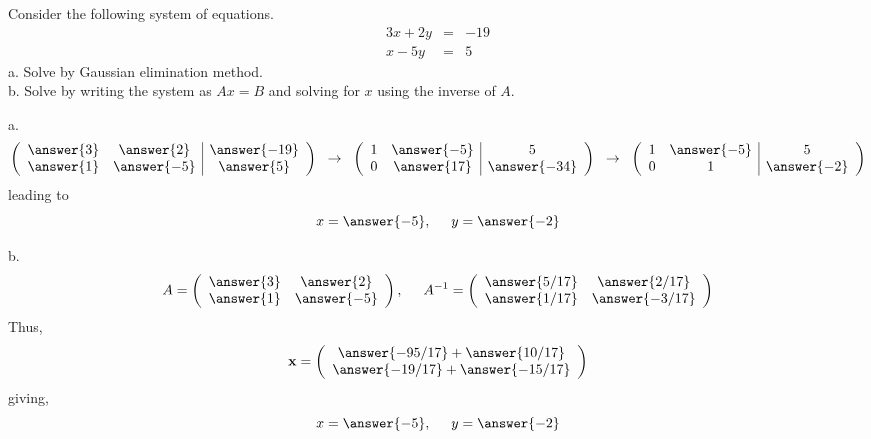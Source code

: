 \documentclass{ximera}
\author{Parisa Fatheddin}
\begin{document}
\begin{exercise}
Consider the following system of equations.
\begin{eqnarray*}
3x+ 2y&=& -19\\
x-5y &=& 5
\end{eqnarray*}
a. Solve by Gaussian elimination method. \\
b. Solve by writing the system as $Ax=B$ and solving for $x$ using the inverse of $A$. 
\begin{prompt}
a.
\[\left(\begin{array}{cc|c}
\answer{3} & \answer{2} & \answer{-19}\\
\answer{1} & \answer{-5} & \answer{5}
\end{array}\right) \hspace{.2cm} \rightarrow \hspace{.2cm}
\left(\begin{array}{cc|c}
1 & \answer{-5} & 5\\
0 & \answer{17} & \answer{-34}
\end{array}\right)\hspace{.2cm} \rightarrow \hspace{.2cm}
\left(\begin{array}{cc|c}
1 & \answer{-5} & 5\\
0 & 1 & \answer{-2}
\end{array}\right)
\]
leading to
\begin{equation*}
x= \answer{-5}, \hspace{.5cm} y = \answer{-2}
\end{equation*}

b.
\[A= \left(\begin{array}{cc}
\answer{3} & \answer{2}\\
\answer{1} & \answer{-5}
\end{array} \right), \hspace{.5cm} A^{-1}= \left(\begin{array}{cc}
\answer{5/17} & \answer{2/17}\\
\answer{1/17} & \answer{-3/17}
\end{array} \right)
\]
Thus,
\[
\textbf{x} = \left(\begin{array}{c}
\answer{-95/17} + \answer{10/17}\\
\answer{-19/17} + \answer{-15/17}
\end{array}\right)
\]
giving,
\begin{equation*}
x= \answer{-5}, \hspace{.5cm} y = \answer{-2}
\end{equation*}










\end{prompt}
\end{exercise}
\end{document}
